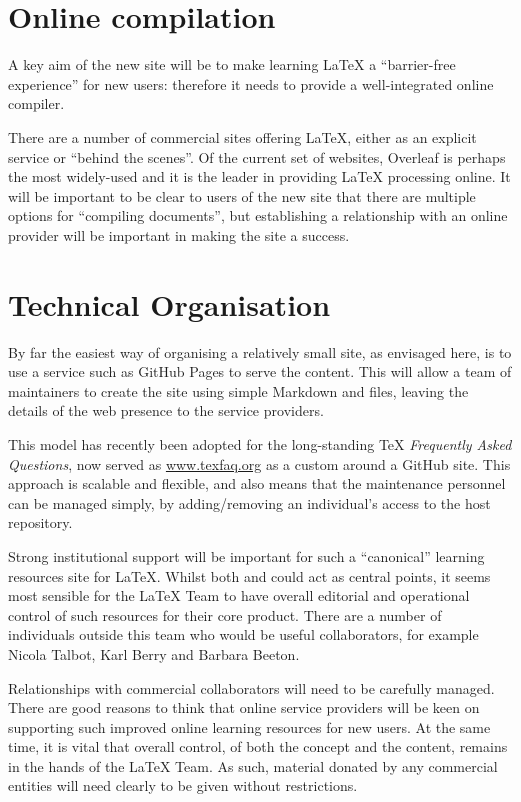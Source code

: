 \documentclass{article}
\begin{document}
\section{Online compilation}

A key aim of the new site will be to make learning \LaTeX{} a
\enquote{barrier-free experience} for new users: therefore it needs to provide
a well-integrated online compiler.

There are a number of commercial sites offering \LaTeX{}, either as an explicit
service or \enquote{behind the scenes}. Of the current set of websites,
Overleaf is perhaps the most widely-used and it is the leader in providing
\LaTeX{} processing online. It will be important to be clear to users of the
new site that there are multiple options for \enquote{compiling documents}, but
establishing a relationship with an online provider will be important in making
the site a success.

\section{Technical Organisation}

By far the easiest way of organising a relatively small site, as envisaged
here, is to use a service such as GitHub Pages to serve the content. This will
allow a team of maintainers to create the site using simple Markdown and
 files, leaving the details of the web presence to the service
providers.

This model has recently been adopted for the long-standing \TeX{}
\textsl{Frequently Asked Questions}, now served as \url{www.texfaq.org} as a
custom  around a GitHub site. This approach is scalable and flexible,
and also means that the maintenance personnel can be managed simply, by
adding/removing an individual's access to the host repository.

Strong institutional support will be important for such a \enquote{canonical}
learning resources site for \LaTeX{}. Whilst both  and 
could act as central points, it seems most sensible for the \LaTeX{} Team to
have overall editorial and operational control of such resources for their core
product. There are a number of individuals outside this team who would be
useful collaborators, for example Nicola Talbot, Karl Berry and Barbara Beeton.

Relationships with commercial collaborators will need to be carefully managed.
There are good reasons to think that online service providers will be keen on
supporting such improved online learning resources for new users. At the same
time, it is vital that overall control, of both the concept and the content,
remains in the hands of the \LaTeX{} Team. As such, material donated by any
commercial entities will need clearly to be given without restrictions.
\end{document}

